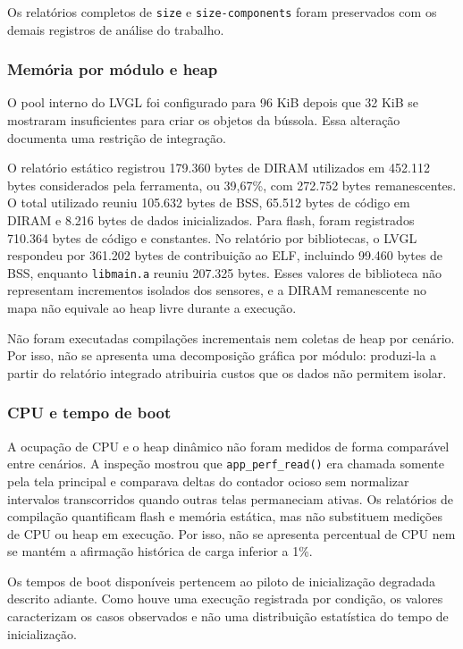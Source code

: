 \documentclass[a4paper,12pt]{article}
\begin{document}
Os relat\'orios completos de \texttt{size} e \texttt{size-components} foram preservados com os demais registros de an\'alise do trabalho.


\subsubsection{Mem\'oria por m\'odulo e heap}


O pool interno do LVGL foi configurado para 96 KiB depois que 32 KiB se mostraram insuficientes para criar os objetos da b\'ussola. Essa altera\c{c}\~ao documenta uma restri\c{c}\~ao de integra\c{c}\~ao.

O relat\'orio est\'atico registrou 179.360 bytes de DIRAM utilizados em 452.112 bytes considerados pela ferramenta, ou 39,67\%, com 272.752 bytes remanescentes. O total utilizado reuniu 105.632 bytes de BSS, 65.512 bytes de c\'odigo em DIRAM e 8.216 bytes de dados inicializados. Para flash, foram registrados 710.364 bytes de c\'odigo e constantes. No relat\'orio por bibliotecas, o LVGL respondeu por 361.202 bytes de contribui\c{c}\~ao ao ELF, incluindo 99.460 bytes de BSS, enquanto \texttt{libmain.a} reuniu 207.325 bytes. Esses valores de biblioteca n\~ao representam incrementos isolados dos sensores, e a DIRAM remanescente no mapa n\~ao equivale ao heap livre durante a execu\c{c}\~ao.


N\~ao foram executadas compila\c{c}\~oes incrementais nem coletas de heap por cen\'ario. Por isso, n\~ao se apresenta uma decomposi\c{c}\~ao gr\'afica por m\'odulo: produzi-la a partir do relat\'orio integrado atribuiria custos que os dados n\~ao permitem isolar.


\subsubsection{CPU e tempo de boot}

A ocupa\c{c}\~ao de CPU e o heap din\^amico n\~ao foram medidos de forma compar\'avel entre cen\'arios. A inspe\c{c}\~ao mostrou que \texttt{app\_perf\_read()} era chamada somente pela tela principal e comparava deltas do contador ocioso sem normalizar intervalos transcorridos quando outras telas permaneciam ativas. Os relat\'orios de compila\c{c}\~ao quantificam flash e mem\'oria est\'atica, mas n\~ao substituem medi\c{c}\~oes de CPU ou heap em execu\c{c}\~ao. Por isso, n\~ao se apresenta percentual de CPU nem se mant\'em a afirma\c{c}\~ao hist\'orica de carga inferior a 1\%.

Os tempos de boot dispon\'iveis pertencem ao piloto de inicializa\c{c}\~ao degradada descrito adiante. Como houve uma execu\c{c}\~ao registrada por condi\c{c}\~ao, os valores caracterizam os casos observados e n\~ao uma distribui\c{c}\~ao estat\'istica do tempo de inicializa\c{c}\~ao.
\end{document}
